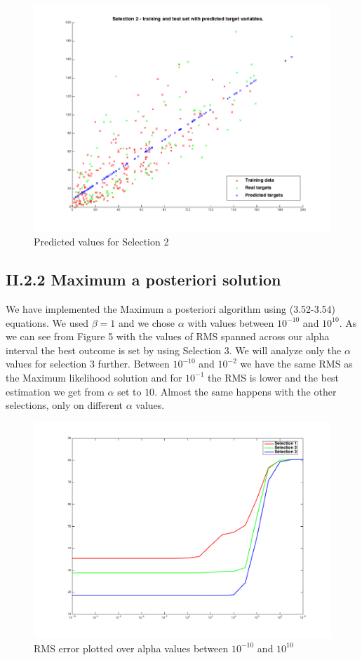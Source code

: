\documentclass{article}      %
\begin{document}
\begin{figure}[ht]
\centering
\includegraphics[scale=.4]{img/sel2-pred}
\caption{Predicted values for Selection 2 \label{overflow}}
\end{figure}

\subsection*{II.2.2 Maximum a posteriori solution}

We have implemented the Maximum a posteriori algorithm using (3.52-3.54) equations. We used $\beta = 1$ and we chose $\alpha$ with values between $10^{-10}$ and $10^{10}$. As we can see from Figure 5 with the values of RMS spanned across our alpha interval the best outcome is set by using Selection 3. We will analyze only the $\alpha$ values for selection 3 further. Between $10^{-10}$ and $10^{-2}$ we have the same RMS as the Maximum likelihood solution and for $10^{-1}$ the RMS is lower and the best estimation we get from $\alpha$ set to $10$. Almost the same happens with the other selections, only on different $\alpha$ values.\\

\begin{figure}[ht]
\centering
\includegraphics[scale=.4]{img/rms}
\caption{RMS error plotted over alpha values between $10^{-10}$ and $10^{10}$  \label{overflow}}
\end{figure}
\end{document}
